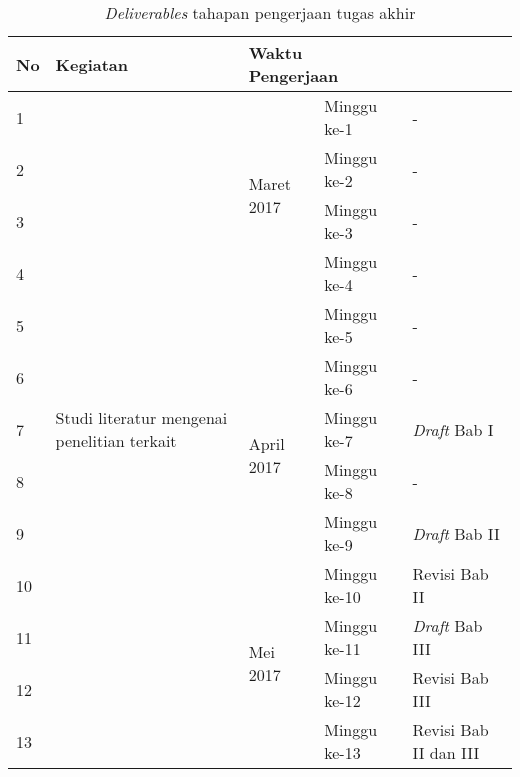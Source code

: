 \begin {table}[H]
\begin{center}
\begin{tabular}{|p{.5cm}|l|l|l|l|}

\hline
No & Kegiatan & \multicolumn{2}{|l|}{Waktu Pengerjaan} & \\
\hline

1 & \multirow{13}{2.5cm}{Studi literatur mengenai penelitian terkait} & \multirow{4}{*}{Maret 2017} & Minggu ke-1 & - \\
\cline{1-1} \cline{4-5}

2 & & & Minggu ke-2 & - \\
\cline{1-1} \cline{4-5}

3 & & & Minggu ke-3 & - \\
\cline{1-1} \cline{4-5}

4 & & & Minggu ke-4 & - \\
\cline{1-1} \cline{4-5}

5 & & & Minggu ke-5 & - \\
\cline{1-1} \cline{3-5}

6 & & \multirow{4}{*}{April 2017} & Minggu ke-6 & - \\
\cline{1-1} \cline{4-5}

7 & & & Minggu ke-7 & \emph{Draft} Bab I \\
\cline{1-1} \cline{4-5}

8 & & & Minggu ke-8 & - \\
\cline{1-1} \cline{4-5}

9 & & & Minggu ke-9 & \emph{Draft} Bab II \\
\cline{1-1} \cline{4-5}

10 & & \multirow{4}{*}{Mei 2017} & Minggu ke-10 & Revisi Bab II \\
\cline{1-1} \cline{3-5}

11 & & & Minggu ke-11 & \emph{Draft} Bab III \\
\cline{1-1} \cline{4-5}

12 & & & Minggu ke-12 & Revisi Bab III \\
\cline{1-1} \cline{4-5}

13 & & & Minggu ke-13 & Revisi Bab II dan III \\
\hline

\end{tabular}
\caption {\emph{Deliverables} tahapan pengerjaan tugas akhir}
\end{center}
\end{table}
